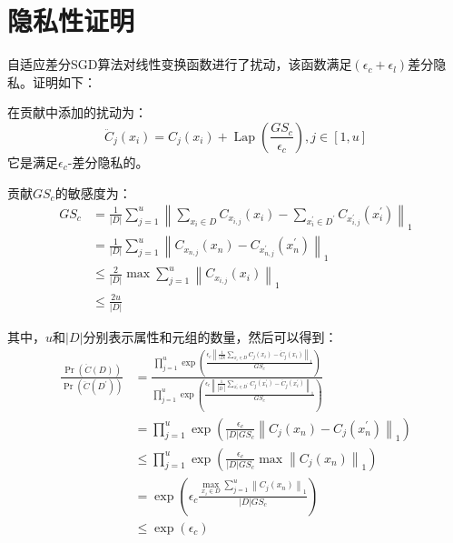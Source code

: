 \section{隐私性证明}
自适应差分SGD算法对线性变换函数进行了扰动，该函数满足$\left(\epsilon_{c}+\epsilon_{l}\right)$差分隐私。证明如下：

在贡献中添加的扰动为：
\begin{equation}\label{eq:贡献中添加的噪声}
\ddot{C}_{j}\left(x_{i}\right)=C_{j}\left(x_{i}\right)+\operatorname{Lap}\left(\frac{G S_{c}}{\epsilon_{c}}\right), j \in[1, u]
\end{equation}
它是满足$\epsilon_{c}$-差分隐私的。

贡献$G S_{c}$的敏感度为：
\begin{equation}\label{eq:贡献敏感度}
\begin{aligned}
G S_{c} &=\frac{1}{|D|} \sum_{j=1}^{u}\left\|\sum_{x_{i} \in D} C_{x_{i, j}}\left(x_{i}\right)-\sum_{x_{i}^{\prime} \in D^{\prime}} C_{x_{i, j}^{\prime}}\left(x_{i}^{\prime}\right)\right\|_{1} \\
&=\frac{1}{|D|} \sum_{j=1}^{u}\left\|C_{x_{n, j}}\left(x_{n}\right)-C_{x_{n, j}^{\prime}}\left(x_{n}^{\prime}\right)\right\|_{1} \\
& \leq \frac{2}{|D|} \max \sum_{j=1}^{u}\left\|C_{x_{i, j}}\left(x_{i}\right)\right\|_{1} \\
& \leq \frac{2 u}{|D|}
\end{aligned}
\end{equation}

其中，$u$和$|D|$分别表示属性和元组的数量，然后可以得到：
\begin{equation}\label{贡献数量和元组}
\begin{aligned}
\frac{\operatorname{Pr}(\ddot{C}(D))}{\operatorname{Pr}\left(\ddot{C}\left(D^{\prime}\right)\right)} &=\frac{\prod_{j=1}^{u} \exp \left(\frac{\epsilon_{c}\left\|\frac{1}{|D|} \sum_{x_{i} \in D} C_{j}\left(x_{i}\right)-\ddot{C}_{j}\left(x_{i}\right)\right\|_{1}}{G S_{c}}\right)}{\prod_{j=1}^{u} \exp \left(\frac{\epsilon_{c}\left\|\frac{1}{\left|D^{\prime}\right|} \sum_{x_{i}^{\prime} \in D^{\prime}} C_{j}\left(x_{i}^{\prime}\right)-\ddot{C}_{j}\left(x_{i}^{\prime}\right)\right\|_{1}}{G S_{c}}\right)} \\
&=\prod_{j=1}^{u} \exp \left(\frac{\epsilon_{c}}{|D| G S_{c}}\left\|C_{j}\left(x_{n}\right)-C_{j}\left(x_{n}^{\prime}\right)\right\|_{1}\right) \\
& \leq \prod_{j=1}^{u} \exp \left(\frac{\epsilon_{c}}{|D| G S_{c}} \max \left\|C_{j}\left(x_{n}\right)\right\|_{1}\right) \\
&=\exp \left(\epsilon_{c} \frac{\max _{x_{i} \in D} \sum_{j=1}^{u}\left\|C_{j}\left(x_{n}\right)\right\|_{1}}{|D| G S_{c}}\right) \\
& \leq \exp \left(\epsilon_{c}\right)
\end{aligned}
\end{equation}

